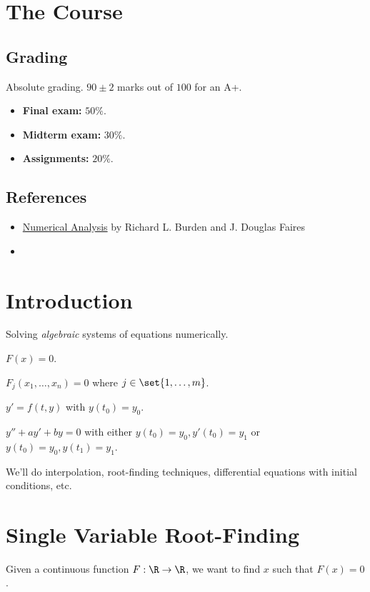 
\section{The Course} \label{sec:course}
\subsection{Grading} \label{sec:grading}
Absolute grading.
$90 \pm 2$ marks out of $100$ for an A+.
\begin{itemize}
    \item \textbf{Final exam:} $50\%$.
    \item \textbf{Midterm exam:} $30\%$.
    \item \textbf{Assignments:} $20\%$.
\end{itemize}
\subsection{References} \label{sec:references}
\begin{itemize}
    \item \href{https://faculty.ksu.edu.sa/sites/default/files/numerical_analysis_9th.pdf}
        {Numerical Analysis} by Richard L. Burden and J. Douglas Faires
    \item 
\end{itemize}
\section{Introduction} \label{sec:intro}
Solving \emph{algebraic} systems of equations numerically.
\begin{examples}
    \item $F(x) = 0$.
    \item $F_{j}(x_{1}, \dots, x_{n}) = 0$ where $j \in \set{1, \dots, m}$.
    \item $y' = f(t, y)$ with $y(t_{0}) = y_{0}$.
    \item $y'' + a y' + b y = 0$ with either
        $y(t_{0}) = y_{0}, y'(t_{0}) = y_{1}$ or
        $y(t_{0}) = y_{0}, y(t_{1}) = y_{1}$.
\end{examples}

We'll do interpolation, root-finding techniques, differential equations with
initial conditions, etc.

\section{Single Variable Root-Finding} \label{sec:root-finding}
Given a continuous function $F : \R \to \R$, we want to find $x$ such that
$F(x) = 0$.

